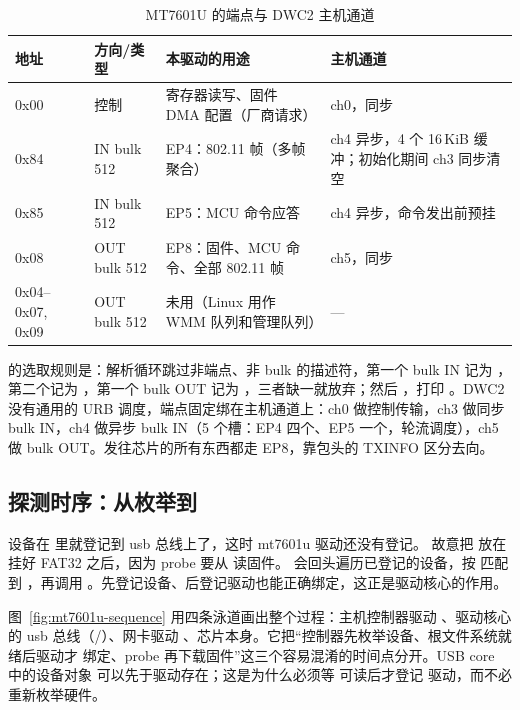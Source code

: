 \begin{table}[htbp]
  \centering
  \caption{MT7601U 的端点与 DWC2 主机通道}
  \label{tab:mt7601u-ep}
  \small
  \begin{tabularx}{\linewidth}{@{}lllX@{}}
    \toprule
    地址 & 方向/类型 & 本驱动的用途 & 主机通道 \\
    \midrule
    0x00 & 控制 & 寄存器读写、固件 DMA 配置（厂商请求） & ch0，同步 \\
    0x84 & IN bulk 512 & EP4：802.11 帧（多帧聚合） & ch4 异步，4 个 16\,KiB 缓冲；初始化期间 ch3 同步清空 \\
    0x85 & IN bulk 512 & EP5：MCU 命令应答 & ch4 异步，命令发出前预挂 \\
    0x08 & OUT bulk 512 & EP8：固件、MCU 命令、全部 802.11 帧 & ch5，同步 \\
    0x04--0x07, 0x09 & OUT bulk 512 & 未用（Linux 用作 WMM 队列和管理队列） & --- \\
    \bottomrule
  \end{tabularx}
\end{table}

 的选取规则是：解析循环跳过非端点、非 bulk 的描述符，第一个 bulk IN 记为 ，第二个记为 ，第一个 bulk OUT 记为 ，三者缺一就放弃；然后 ，打印 。DWC2 没有通用的 URB 调度，端点固定绑在主机通道上：ch0 做控制传输，ch3 做同步 bulk IN，ch4 做异步 bulk IN（5 个槽：EP4 四个、EP5 一个，轮流调度），ch5 做 bulk OUT。发往芯片的所有东西都走 EP8，靠包头的 TXINFO 区分去向。

\subsection{探测时序：从枚举到 }
\label{sec:mt7601u-probe}

设备在  里就登记到 usb 总线上了，这时 mt7601u 驱动还没有登记。 故意把  放在  挂好 FAT32 之后，因为 probe 要从  读固件。 会回头遍历已登记的设备，按  匹配到 ，再调用 。先登记设备、后登记驱动也能正确绑定，这正是驱动核心的作用。

图~\ref{fig:mt7601u-sequence} 用四条泳道画出整个过程：主机控制器驱动 、驱动核心的 usb 总线（/）、网卡驱动 、芯片本身。它把“控制器先枚举设备、根文件系统就绪后驱动才
绑定、probe 再下载固件”这三个容易混淆的时间点分开。USB core 中的设备对象
可以先于驱动存在；这是为什么必须等  可读后才登记
 驱动，而不必重新枚举硬件。

